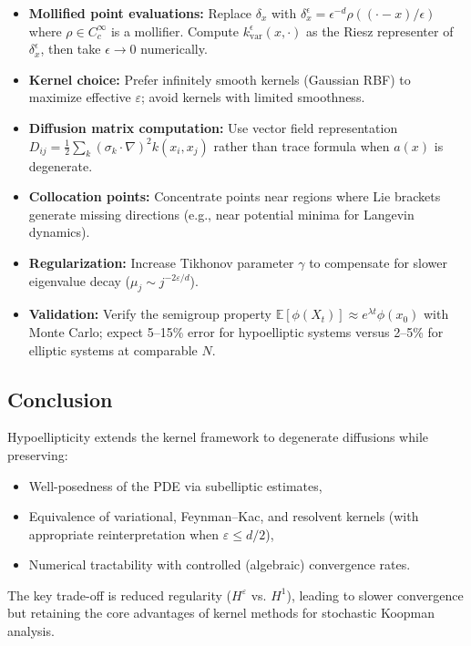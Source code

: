\documentclass[11pt,a4paper]{article}
\begin{document}
\begin{itemize}[leftmargin=1.5em]
    \item \textbf{Mollified point evaluations:} Replace $\delta_x$ with $\delta_x^\epsilon = \epsilon^{-d}\rho((\cdot-x)/\epsilon)$ where $\rho \in C_c^\infty$ is a mollifier. Compute $k_{\mathrm{var}}^\epsilon(x,\cdot)$ as the Riesz representer of $\delta_x^\epsilon$, then take $\epsilon \to 0$ numerically.
    
    \item \textbf{Kernel choice:} Prefer infinitely smooth kernels (Gaussian RBF) to maximize effective $\varepsilon$; avoid kernels with limited smoothness.
    
    \item \textbf{Diffusion matrix computation:} Use vector field representation $D_{ij} = \frac{1}{2}\sum_k (\sigma_k\cdot\nabla)^2 k(x_i,x_j)$ rather than trace formula when $a(x)$ is degenerate.
    
    \item \textbf{Collocation points:} Concentrate points near regions where Lie brackets generate missing directions (e.g., near potential minima for Langevin dynamics).
    
    \item \textbf{Regularization:} Increase Tikhonov parameter $\gamma$ to compensate for slower eigenvalue decay ($\mu_j \sim j^{-2\varepsilon/d}$).
    
    \item \textbf{Validation:} Verify the semigroup property $\mathbb{E}[\phi(X_t)] \approx e^{\lambda t}\phi(x_0)$ with Monte Carlo; expect 5--15\% error for hypoelliptic systems versus 2--5\% for elliptic systems at comparable $N$.
\end{itemize}

\subsection{Conclusion}

Hypoellipticity extends the kernel framework to degenerate diffusions while preserving:
\begin{itemize}[leftmargin=1.5em]
    \item Well-posedness of the PDE via subelliptic estimates,
    \item Equivalence of variational, Feynman--Kac, and resolvent kernels (with appropriate reinterpretation when $\varepsilon \leq d/2$),
    \item Numerical tractability with controlled (algebraic) convergence rates.
\end{itemize}
The key trade-off is reduced regularity ($H^\varepsilon$ vs. $H^1$), leading to slower convergence but retaining the core advantages of kernel methods for stochastic Koopman analysis.
 
\end{document}
